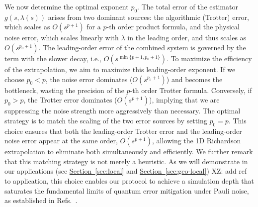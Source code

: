 \documentclass[aps,pra,reprint,groupedaddress,floatfix]{revtex4-2}
\renewcommand{\sec}[1]{\hyperref[sec:#1]{Section~\ref*{sec:#1}}}
\newcommand{\xz}[1]{{\color{cyan} XZ: #1}}
\begin{document}
We now determine the optimal exponent $p_0$. The total error of the estimator $g(s, \lambda(s))$ arises from two dominant sources: the algorithmic (Trotter) error, which scales as $O(s^{p+1})$ for a $p$-th order product formula, and the physical noise error, which scales linearly with $\lambda$ in the leading order, and thus scales as $O(s^{p_0+1})$.
The leading-order error of the combined system is governed by the term with the slower decay, i.e., $O(s^{\min\{p+1, p_0+1\}})$. To maximize the efficiency of the extrapolation, we aim to maximize this leading-order exponent. If we choose $p_0 < p$, the noise error dominates ($O(s^{p_0+1})$) and becomes the bottleneck, wasting the precision of the $p$-th order Trotter formula. Conversely, if $p_0 > p$, the Trotter error dominates ($O(s^{p+1})$), implying that we are suppressing the noise strength more aggressively than necessary.
The optimal strategy is to match the scaling of the two error sources by setting $p_0 = p$. This choice ensures that both the leading-order Trotter error and the leading-order noise error appear at the same order, $O(s^{p+1})$, allowing the 1D Richardson extrapolation to eliminate both simultaneously and efficiently. We further remark that this matching strategy is not merely a heuristic. As we will demonstrate in our applications (see \sec{local} and \sec{geo-local}) \xz{add ref to application}, this choice enables our protocol to achieve a simulation depth that saturates the fundamental limits of quantum error mitigation under Pauli noise, as established in Refs.~\cite{wang2021noise, cai2021multi}.
\end{document}

